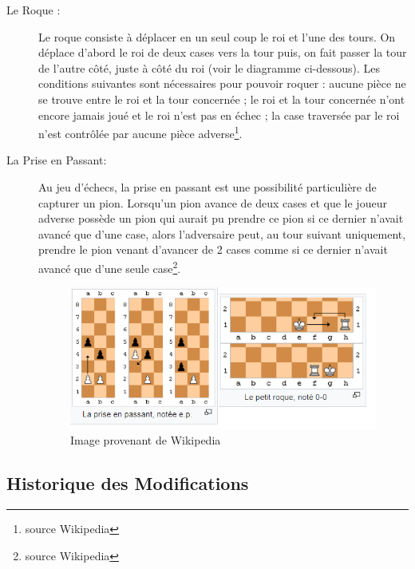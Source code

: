 \documentclass[10pt, a4paper]{article}
\begin{document}
\begin{description}
		\item[Le Roque :] Le roque consiste à déplacer en un seul coup le roi et l'une des tours. On déplace d'abord le roi de deux cases vers la tour puis, on fait passer la tour de l'autre côté, juste à côté du roi (voir le diagramme ci-dessous). Les conditions suivantes sont nécessaires pour pouvoir roquer : aucune pièce ne se trouve entre le roi et la tour concernée ; le roi et la tour concernée n'ont encore jamais joué et le roi n'est pas en échec ;
la case traversée par le roi n'est contrôlée par aucune pièce adverse\footnote{source Wikipedia}.
		\item[La Prise en Passant:] Au jeu d’échecs, la prise en passant est une possibilité particulière de capturer un pion. Lorsqu’un pion avance de deux cases et que le joueur adverse possède un pion qui aurait pu prendre ce pion si ce dernier n'avait avancé que d'une case, alors l'adversaire peut, au tour suivant uniquement, prendre le pion venant d'avancer de 2 cases comme si ce dernier n'avait avancé que d'une seule case\footnote{source Wikipedia}.
		\begin{figure}[bh]
		\centering
		\includegraphics[scale=1]{roque_prise_passant.png}
		\caption{Image provenant de Wikipedia}
		\end{figure}

		\end{description}
		\clearpage

		\subsection{Historique des Modifications}
\end{document}
